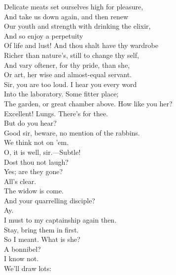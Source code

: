 \documentclass[a4paper,oneside]{memoir}
\begin{document}
\begin{drama*}
Delicate meats set ourselves high for pleasure,\\
And take us down again, and then renew\\
Our youth and strength with drinking the elixir,\\
And so enjoy a perpetuity\\
Of life and lust! And thou shalt have thy wardrobe\\
Richer than nature's, still to change thy self,\\
And vary oftener, for thy pride, than she,\\
Or art, her wise and almost-equal servant.\\
\facespeaks Sir, you are too loud. I hear you every word\\
Into the laboratory. Some fitter place;\\
The garden, or great chamber above. How like you her?\\
\mammonspeaks Excellent! Lungs. There's for thee.\\
\facespeaks {} But do you hear?\\
Good sir, beware, no mention of the rabbins.\\
\mammonspeaks We think not on 'em.\\
\facespeaks {} O, it is well, sir.---Subtle!\\
Dost thou not laugh?\\
\subtlespeaks {} Yes; are they gone?\\
\facespeaks {} All's clear.\\
\subtlespeaks The widow is come.\\
\facespeaks {} And your quarrelling disciple?\\
\subtlespeaks Ay.\\
\facespeaks {} I must to my captainship again then.\\
\subtlespeaks Stay, bring them in first.\\
\facespeaks {} So I meant. What is she?\\
A bonnibel?\\
\subtlespeaks {} I know not.\\
\facespeaks {} We'll draw lots:\\

\end{drama*}
\end{document}
